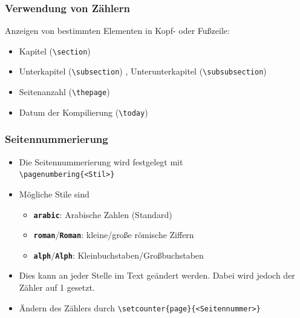 \begin{frame}[fragile]
\frametitle{Verwendung von Zählern}
Anzeigen von bestimmten Elementen in Kopf- oder Fußzeile:
\begin{itemize}[<+->]
  	\item Kapitel (\lstinline[style=Latex]+\section+)	
	\item Unterkapitel (\lstinline[style=Latex]+\subsection+) , Unterunterkapitel (\lstinline[style=Latex]+\subsubsection+)
	\item Seitenanzahl (\lstinline[style=Latex]+\thepage+)
	\item Datum der Kompilierung (\lstinline[style=Latex]+\today+)
\end{itemize}
\end{frame}

\begin{frame}[fragile]
\frametitle{Seitennummerierung}
\begin{itemize}[<+->]
  \item Die Seitennummerierung wird festgelegt mit \\
  \quad \lstinline[style=Latex]+\pagenumbering{<Stil>}+
  \item Mögliche Stile sind
  \begin{itemize}
    \item \texttt{\textbf{arabic}}: Arabische Zahlen (Standard)
    \item \texttt{\textbf{roman}}/\texttt{\textbf{Roman}}: kleine/große römische Ziffern
    \item \texttt{\textbf{alph}}/\texttt{\textbf{Alph}}: Kleinbuchstaben/Großbuchstaben
  \end{itemize}
  \item Dies kann an jeder Stelle im Text geändert werden. Dabei wird jedoch der Zähler auf 1 gesetzt.
  \item Ändern des Zählers durch \lstinline[style=Latex]+\setcounter{page}{<Seitennummer>}+
\end{itemize}
\end{frame}

